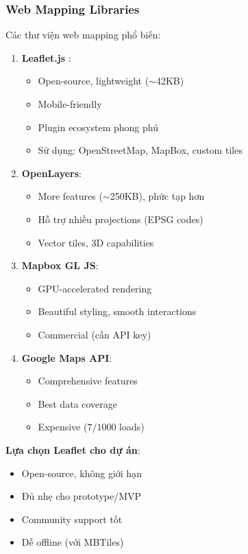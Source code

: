 \subsubsection{Web Mapping Libraries}
Các thư viện web mapping phổ biến:

\begin{enumerate}
    \item \textbf{Leaflet.js} \cite{leafletjs}:
    \begin{itemize}
        \item Open-source, lightweight ($\sim$42KB)
        \item Mobile-friendly
        \item Plugin ecosystem phong phú
        \item Sử dụng: OpenStreetMap, MapBox, custom tiles
    \end{itemize}
    
    \item \textbf{OpenLayers}:
    \begin{itemize}
        \item More features ($\sim$250KB), phức tạp hơn
        \item Hỗ trợ nhiều projections (EPSG codes)
        \item Vector tiles, 3D capabilities
    \end{itemize}
    
    \item \textbf{Mapbox GL JS}:
    \begin{itemize}
        \item GPU-accelerated rendering
        \item Beautiful styling, smooth interactions
        \item Commercial (cần API key)
    \end{itemize}
    
    \item \textbf{Google Maps API}:
    \begin{itemize}
        \item Comprehensive features
        \item Best data coverage
        \item Expensive ($7/1000$ loads)
    \end{itemize}
\end{enumerate}

\textbf{Lựa chọn Leaflet cho dự án}:
\begin{itemize}
    \item Open-source, không giới hạn
    \item Đủ nhẹ cho prototype/MVP
    \item Community support tốt
    \item Dễ offline (với MBTiles)
\end{itemize}


